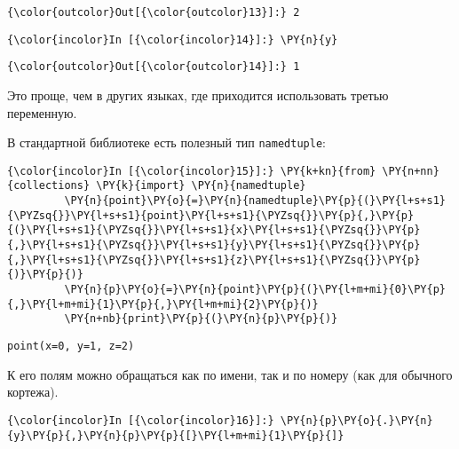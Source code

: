             \begin{Verbatim}[commandchars=\\\{\}]
{\color{outcolor}Out[{\color{outcolor}13}]:} 2
\end{Verbatim}
        
    \begin{Verbatim}[commandchars=\\\{\}]
{\color{incolor}In [{\color{incolor}14}]:} \PY{n}{y}
\end{Verbatim}

            \begin{Verbatim}[commandchars=\\\{\}]
{\color{outcolor}Out[{\color{outcolor}14}]:} 1
\end{Verbatim}
        
    Это проще, чем в других языках, где приходится использовать третью
переменную.

В стандартной библиотеке есть полезный тип \texttt{namedtuple}:

    \begin{Verbatim}[commandchars=\\\{\}]
{\color{incolor}In [{\color{incolor}15}]:} \PY{k+kn}{from} \PY{n+nn}{collections} \PY{k}{import} \PY{n}{namedtuple}
         \PY{n}{point}\PY{o}{=}\PY{n}{namedtuple}\PY{p}{(}\PY{l+s+s1}{\PYZsq{}}\PY{l+s+s1}{point}\PY{l+s+s1}{\PYZsq{}}\PY{p}{,}\PY{p}{(}\PY{l+s+s1}{\PYZsq{}}\PY{l+s+s1}{x}\PY{l+s+s1}{\PYZsq{}}\PY{p}{,}\PY{l+s+s1}{\PYZsq{}}\PY{l+s+s1}{y}\PY{l+s+s1}{\PYZsq{}}\PY{p}{,}\PY{l+s+s1}{\PYZsq{}}\PY{l+s+s1}{z}\PY{l+s+s1}{\PYZsq{}}\PY{p}{)}\PY{p}{)}
         \PY{n}{p}\PY{o}{=}\PY{n}{point}\PY{p}{(}\PY{l+m+mi}{0}\PY{p}{,}\PY{l+m+mi}{1}\PY{p}{,}\PY{l+m+mi}{2}\PY{p}{)}
         \PY{n+nb}{print}\PY{p}{(}\PY{n}{p}\PY{p}{)}
\end{Verbatim}


    \begin{Verbatim}[commandchars=\\\{\}]
point(x=0, y=1, z=2)

    \end{Verbatim}

    К его полям можно обращаться как по имени, так и по номеру (как для
обычного кортежа).

    \begin{Verbatim}[commandchars=\\\{\}]
{\color{incolor}In [{\color{incolor}16}]:} \PY{n}{p}\PY{o}{.}\PY{n}{y}\PY{p}{,}\PY{n}{p}\PY{p}{[}\PY{l+m+mi}{1}\PY{p}{]}
\end{Verbatim}


